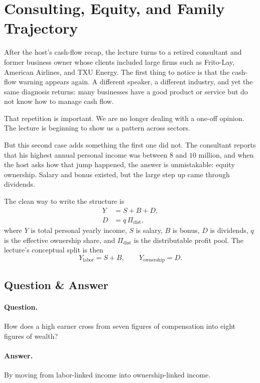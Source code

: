 \section{Consulting, Equity, and Family Trajectory}

After the host's cash-flow recap, the lecture turns to a retired consultant and former business owner whose clients included large firms such as Frito-Lay, American Airlines, and TXU Energy. The first thing to notice is that the cash-flow warning appears again. A different speaker, a different industry, and yet the same diagnosis returns: many businesses have a good product or service but do not know how to manage cash flow.

That repetition is important. We are no longer dealing with a one-off opinion. The lecture is beginning to show us a pattern across sectors.

But this second case adds something the first one did not. The consultant reports that his highest annual personal income was between \(8\) and \(10\) million, and when the host asks how that jump happened, the answer is unmistakable: equity ownership. Salary and bonus existed, but the large step up came through dividends.

The clean way to write the structure is
\begin{align}
Y &= S + B + D,\\
D &= q\,\Pi_{\mathrm{dist}},
\end{align}
where \(Y\) is total personal yearly income, \(S\) is salary, \(B\) is bonus, \(D\) is dividends, \(q\) is the effective ownership share, and \(\Pi_{\mathrm{dist}}\) is the distributable profit pool. The lecture's conceptual split is then
\begin{equation}
Y_{\mathrm{labor}} = S+B,
\qquad
Y_{\mathrm{ownership}} = D.
\end{equation}

\subsection{Question \& Answer}

\paragraph{Question.} How does a high earner cross from seven figures of compensation into eight figures of wealth?

\paragraph{Answer.} By moving from labor-linked income into ownership-linked income.

